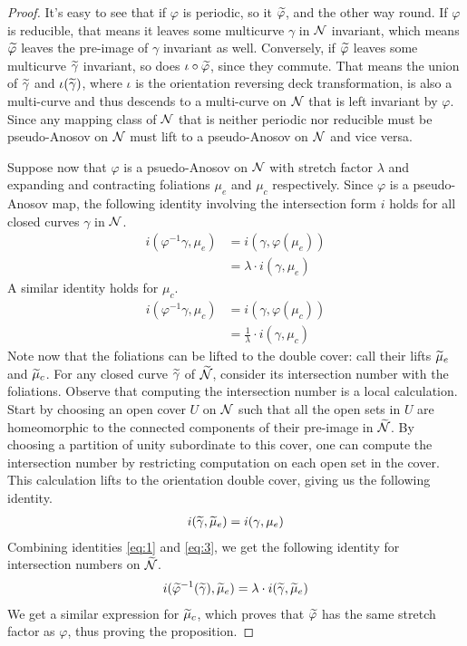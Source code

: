 \begin{proof}
  It's easy to see that if $\varphi$ is periodic, so it $\widetilde{\varphi}$, and the other way round.
  If $\varphi$ is reducible, that means it leaves some multicurve $\gamma$ in $\mathcal{N}$ invariant, which means $\widetilde{\varphi}$ leaves the pre-image of $\gamma$ invariant as well.
  Conversely, if $\widetilde{\varphi}$ leaves some multicurve $\widetilde{\gamma}$ invariant, so does $\iota \circ \widetilde{\varphi}$, since they commute.
  That means the union of $\widetilde{\gamma}$ and $\iota(\widetilde{\gamma})$, where $\iota$ is the orientation reversing deck transformation, is also a multi-curve and thus descends to a multi-curve on $\mathcal{N}$ that is left invariant by $\varphi$.
  Since any mapping class of $\mathcal{N}$ that is neither periodic nor reducible must be pseudo-Anosov on $\mathcal{N}$ must lift to a pseudo-Anosov on $\mathcal{N}$ and vice versa.

  Suppose now that $\varphi$ is a psuedo-Anosov on $\mathcal{N}$ with stretch factor $\lambda$ and expanding and contracting foliations $\mu_e$ and $\mu_c$ respectively.
  Since $\varphi$ is a pseudo-Anosov map, the following identity involving the intersection form $i$ holds for all closed curves $\gamma$ in $\mathcal{N}$.
  \begin{align}
    \label{eq:1}
    i(\varphi^{-1}\gamma, \mu_e) &= i(\gamma, \varphi(\mu_e)) \\
                               &= \lambda \cdot i(\gamma, \mu_e)
  \end{align}
  A similar identity holds for $\mu_c$.
  \begin{align}
    \label{eq:2}
    i(\varphi^{-1}\gamma, \mu_c) &= i(\gamma, \varphi(\mu_c)) \\
                               &= \frac{1}{\lambda} \cdot i(\gamma, \mu_c)
  \end{align}
  Note now that the foliations can be lifted to the double cover: call their lifts $\widetilde{\mu}_e$ and $\widetilde{\mu}_c$.
  For any closed curve $\widetilde{\gamma}$ of $\widetilde{\mathcal{N}}$, consider its intersection number with the foliations.
  Observe that computing the intersection number is a local calculation.
  Start by choosing an open cover $U$ on $\mathcal{N}$ such that all the open sets in $U$ are homeomorphic to the connected components of their pre-image in $\widetilde{\mathcal{N}}$.
  By choosing a partition of unity subordinate to this cover, one can compute the intersection number by restricting computation on each open set in the cover.
  This calculation lifts to the orientation double cover, giving us the following identity.
  \begin{align}
    \label{eq:3}
    i(\widetilde{\gamma}, \widetilde{\mu}_e) = i(\gamma, \mu_e)
  \end{align}
  Combining identities \eqref{eq:1} and \eqref{eq:3}, we get the following identity for intersection numbers on $\widetilde{\mathcal{N}}$.
  \begin{align*}
    i(\widetilde{\varphi}^{-1} (\widetilde{\gamma}), \widetilde{\mu}_e) = \lambda \cdot i(\widetilde{\gamma}, \widetilde{\mu}_e)
  \end{align*}
  We get a similar expression for $\widetilde{\mu}_c$, which proves that $\widetilde{\varphi}$ has the same stretch factor as $\varphi$, thus proving the proposition.
\end{proof}

